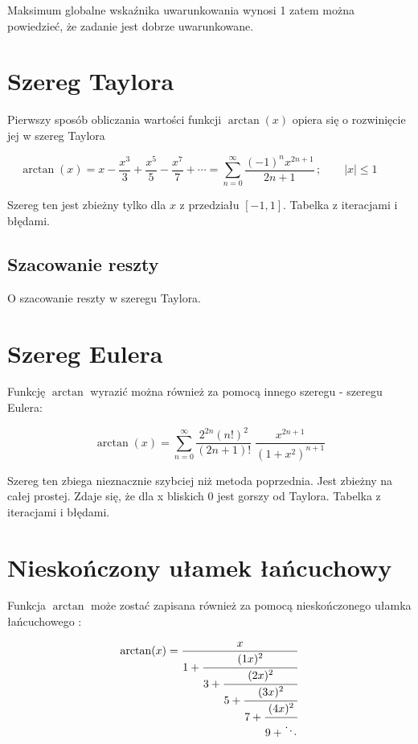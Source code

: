\documentclass{article}
\begin{document}
\indent Maksimum globalne wskaźnika uwarunkowania wynosi 1 zatem można powiedzieć, że zadanie jest dobrze uwarunkowane.

\section{Szereg Taylora}
Pierwszy sposób obliczania wartości funkcji $\arctan(x)$ opiera się o rozwinięcie jej w szereg Taylora

\begin{equation}
\arctan(x)=x-{\frac {x^{3}}{3}}+{\frac {x^{5}}{5}}-{\frac {x^{7}}{7}}+\cdots =\sum _{n=0}^{\infty }{\frac {(-1)^{n}x^{2n+1}}{2n+1}}\,;\qquad |x|\leq 1\qquad 
\end{equation}

Szereg ten jest zbieżny tylko dla $x$ z przedziału $[-1,1]$.
Tabelka z iteracjami i błędami.

\subsection{Szacowanie reszty}
O szacowanie reszty w szeregu Taylora.

\section{Szereg Eulera}

Funkcję $\arctan$ wyrazić można również za pomocą innego szeregu - szeregu Eulera:

\begin{equation}
\arctan (x)=\sum _{n=0}^{\infty }{\frac {2^{2n}(n!)^{2}}{(2n+1)!}}\;{\frac {x^{2n+1}}{(1+x^{2})^{n+1}}}
\end{equation}

Szereg ten zbiega nieznacznie szybciej niż metoda poprzednia.
Jest zbieżny na całej prostej. Zdaje się, że dla x bliskich 0 jest gorszy od Taylora.
Tabelka z iteracjami i błędami.

\section{Nieskończony ułamek łańcuchowy}
Funkcja $\arctan$ może zostać zapisana również za pomocą nieskończonego ułamka łańcuchowego \cite{deutsch}:

\begin{equation}
\arctan(x)={\frac {x}{1+{\cfrac {(1x)^{2}}{3+{\cfrac {(2x)^{2}}{5+{\cfrac {(3x)^{2}}{7+{\cfrac {(4x)^{2}}{9+\ddots }}}}}}}}}}
\end{equation}
\end{document}
